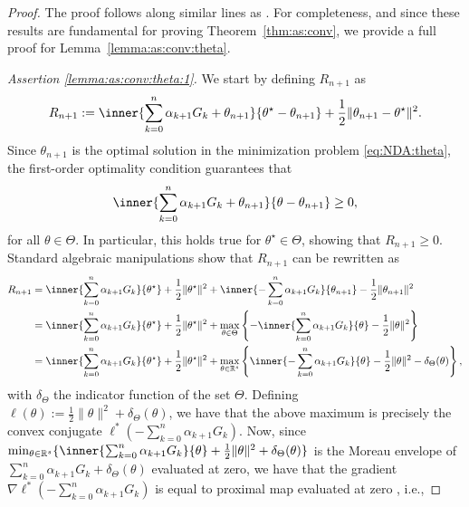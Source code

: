 \documentclass[11pt,a4paper]{article}
\theoremstyle{definition}
\begin{document}
\begin{proof}
The proof follows along similar lines as \citet[Theorems~2 and 3]{duchi2021asymptotic}. For completeness, and since these results are fundamental for proving Theorem~\ref{thm:as:conv}, we provide a full proof for Lemma~\ref{lemma:as:conv:theta}. 

\medskip

\emph{Assertion \ref{lemma:as:conv:theta:1}.} We start by defining $R_{n+1}$ as
\begin{align*}
    R_{n+1} := \inner{\sum_{k=0}^n \alpha_{k+1} G_k + \theta_{n+1}}{\theta^\star-\theta_{n+1}} + \frac{1}{2}\|\theta_{n+1}-\theta^\star\|^2.
\end{align*}
Since $\theta_{n+1}$ is the optimal solution in the minimization problem \eqref{eq:NDA:theta}, the first-order optimality condition guarantees that 
\begin{align*}
    \inner{\sum_{k=0}^n \alpha_{k+1} G_k + \theta_{n+1}}{\theta-\theta_{n+1}} \geq 0,
\end{align*}
for all $\theta\in \Theta$. In particular, this holds true for $\theta^\star \in \Theta$, showing that $R_{n+1} \geq 0$. Standard algebraic manipulations show that $R_{n+1}$ can be rewritten as
\begin{align*}
    R_{n+1} &= \inner{\sum_{k=0}^n \alpha_{k+1} G_k}{\theta^\star} + \frac{1}{2}\|\theta^\star\|^2 + \inner{-\sum_{k=0}^n \alpha_{k+1} G_k}{\theta_{n+1}} - \frac{1}{2}\|\theta_{n+1}\|^2\\
    &= \inner{\sum_{k=0}^n \alpha_{k+1} G_k}{\theta^\star} + \frac{1}{2}\|\theta^\star\|^2 + \max_{\theta \in \Theta} \left\{ -\inner{\sum_{k=0}^n \alpha_{k+1} G_k}{\theta} - \frac{1}{2}\|\theta\|^2\right\}\\
    &= \inner{\sum_{k=0}^n \alpha_{k+1} G_k}{\theta^\star} + \frac{1}{2}\|\theta^\star\|^2 + \max_{\theta \in \mathbb R^s} \left\{ \inner{-\sum_{k=0}^n \alpha_{k+1} G_k}{\theta} - \frac{1}{2}\|\theta\|^2 - \delta_{\Theta}(\theta)\right\},
\end{align*}
with $\delta_\Theta$ the indicator function of the set $\Theta$. Defining $\ell(\theta):= \frac{1}{2}\|\theta\|^2 + \delta_{\Theta}(\theta)$, we have that the above maximum is precisely the convex conjugate $\ell^*(-\sum_{k=0}^n \alpha_{k+1} G_k)$. Now, since $\min_{\theta \in \mathbb R^s} \{ \inner{\sum_{k=0}^n \alpha_{k+1} G_k}{\theta} + \frac{1}{2}\|\theta\|^2 + \delta_{\Theta}(\theta)\}$ is the Moreau envelope of $\sum_{k=0}^n \alpha_{k+1} G_k + \delta_{\Theta}(\theta)$ evaluated at zero, we have that the gradient $\nabla \ell^*(-\sum_{k=0}^n \alpha_{k+1} G_k)$ is equal to proximal map evaluated at zero \cite[Theorem~2.26]{rockafellar2009variational}, i.e.,

\end{proof}
\end{document}
